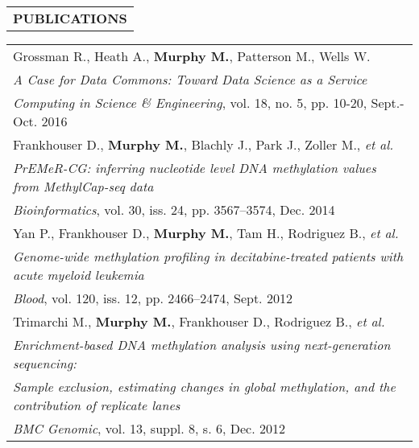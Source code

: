 \begin{tabularx}{\textwidth}{ L }
  \textbf{PUBLICATIONS} \\
\end{tabularx}

\begin{tabularx}{\textwidth}{ X }
    Grossman R., Heath A., \textbf{Murphy M.}, Patterson M., Wells W. \\
    \footnotesize\textit{A Case for Data Commons: Toward Data Science as a Service} \\
    \footnotesize{\textit{Computing in Science \& Engineering}, vol. 18, no. 5, pp. 10-20, Sept.-Oct. 2016} \\

    \vspace{1pt}

    Frankhouser D., \textbf{Murphy M.}, Blachly J., Park J., Zoller M., \textit{et al.} \\
    \footnotesize\textit{PrEMeR-CG: inferring nucleotide level DNA methylation values from MethylCap-seq data} \\
    \footnotesize{\textit{Bioinformatics}, vol. 30, iss. 24, pp. 3567--3574, Dec. 2014} \\

    \vspace{1pt}

    Yan P., Frankhouser D., \textbf{Murphy M.}, Tam H., Rodriguez B., \textit{et al.} \\
    \footnotesize\textit{Genome-wide methylation profiling in decitabine-treated patients with acute myeloid leukemia} \\
    \footnotesize{\textit{Blood}, vol. 120, iss. 12, pp. 2466--2474, Sept. 2012} \\

    \vspace{1pt}

    Trimarchi M., \textbf{Murphy M.}, Frankhouser D., Rodriguez B., \textit{et al.} \\
    \footnotesize\textit{Enrichment-based DNA methylation analysis using next-generation sequencing:} \\
    \footnotesize\textit{Sample exclusion, estimating changes in global methylation, and the contribution of replicate lanes} \\
    \footnotesize{\textit{BMC Genomic}, vol. 13, suppl. 8, s. 6, Dec. 2012} \\
\end{tabularx}

